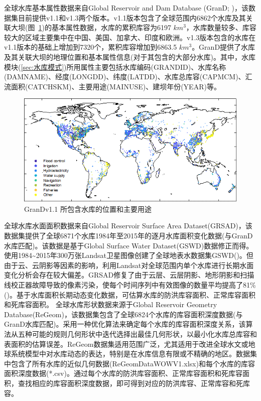 全球水库基本属性数据来自Global Reservoir and Dam Database (GranD; \cite{lehner2011high})，该数据集目前提供v1.1和v1.3两个版本。v1.1版本包含了全球范围内6862个水库及其关联大坝(图~\ref{fig:GranDv1.1 所包含水库的位置和主要用途})的基本属性数据，水库的累积库容为6197 $km^3$，水库数量较多、库容较大的区域主要集中在中国、美国、加拿大、印度和欧洲。v1.3版本包含的水库在v1.1版本的基础上增加到7320个，累积库容增加到6863.5 $km^3$。GranD提供了水库及其关联大坝的地理位置和基本属性信息(对于其包含的大部分水库)。其中，水库模块(\ref{sec:水库模式})所用属性主要包括水库编码(GRAND\textunderscore ID)、水库名称(DAM\textunderscore NAME)、经度(LONG\textunderscore DD)、纬度(LAT\textunderscore DD)、水库总库容(CAP\textunderscore MCM)、汇流面积(CATCH\textunderscore SKM)、主要用途(MAIN\textunderscore USE)、建坝年份(YEAR)等。\\

{
\begin{figure}[h!]
\centering
\includegraphics{Figures/地表输入数据/GranDv1.1.png}
\caption{GranDv1.1 所包含水库的位置和主要用途}
\label{fig:GranDv1.1 所包含水库的位置和主要用途}
\end{figure}
}
全球水库水面面积数据来自Global Reservoir Surface Area Dataset(GRSAD)，该数据集提供了全球6871个水库1984年至2015年的逐月水库面积变化数据(与GranD水库匹配)。该数据是基于Global Surface Water Dataset(GSWD)数据修正而得。\cite{pekel2016high}使用1984\textasciitilde2015年300万张Landsat卫星图像创建了全球地表水数据集GSWD(\citep{pekel2016high})。但由于云、云阴影等因素的影响，利用Landsat对全球范围内单个水库进行长期水面变化分析会存在较大偏差。GRSAD修复了由于云层、云层阴影、地形阴影和扫描线校正器故障导致的像素污染，使每个时间序列中有效图像的数量平均提高了81\%(\citep{zhao2018automatic})。基于水库面积长期动态变化数据，可估算水库的防洪库容面积、正常库容面积和死库容面积。
全球水库形状数据来源于Global Reservoir Geometry Database(ReGeom)，该数据集包含了全球6824个水库的库容\textendash 面积\textendash 深度数据(与GranD水库匹配)。\cite{yigzaw2018new}采用一种优化算法来确定每个水库的库容\textendash 面积\textendash 深度关系，该算法从五种可能的规则几何形状中迭代选择出最佳几何形状，以最小化水库总库容和表面积的估算误差。ReGeom数据集适用范围广泛，尤其适用于改进全球水文或地球系统模型中对水库动态的表达，特别是在水库信息有限或不精确的地区。数据集中包含了所有水库的近似几何数据(ReGeomData\textunderscore WOW\textunderscore V1.xlsx)和每个水库的库容\textendash 面积\textendash 深度数据(*.csv)。通过每个水库的防洪库容面积、正常库容面积和死库容面积，查找相应的库容\textendash 面积\textendash 深度数据，即可得到对应的防洪库容、正常库容和死库容。

